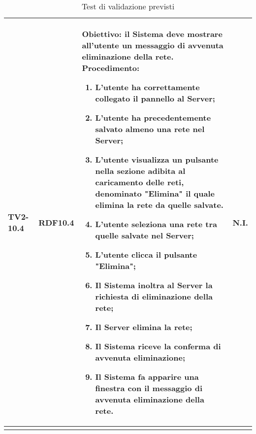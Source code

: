 \begin{longtable}{|C{.15\textwidth}|C{.13\textwidth}|m{.52\textwidth}|C{.08\textwidth}|}
TV2-10.4 & RDF10.4 &
	\textbf{Obiettivo}: il Sistema deve mostrare all'utente un messaggio di avvenuta eliminazione della rete. \newline
	\textbf{Procedimento}:
	\begin{enumerate}
		\item L'utente ha correttamente collegato il pannello al Server;
		\item L'utente ha precedentemente salvato almeno una rete nel Server;
		\item L'utente visualizza un pulsante nella sezione adibita al caricamento delle reti, denominato "Elimina" il quale elimina la rete da quelle salvate.
		\item L'utente seleziona una rete tra quelle salvate nel Server;
		\item L'utente clicca il pulsante "Elimina";
		\item Il Sistema inoltra al Server la richiesta di eliminazione della rete;
		\item Il Server elimina la rete;
		\item Il Sistema riceve la conferma di avvenuta eliminazione;
		\item Il Sistema fa apparire una finestra con il messaggio di avvenuta eliminazione della rete.
	\end{enumerate}
	& N.I. \\
\hline








\caption{Test di validazione previsti}
\label{testvalidazioneprevisti}
\end{longtable}



